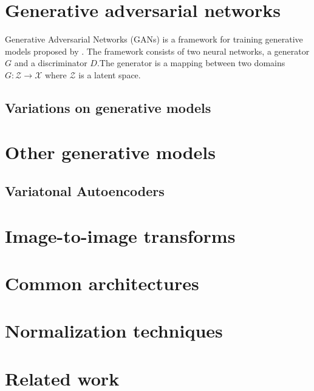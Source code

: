 \section{Generative adversarial networks}
Generative Adversarial Networks (GANs) is a framework for training generative models proposed by \textcite{goodfellow2014generative}. The framework consists of two neural networks, a generator $G$ and a discriminator $D$.The generator is a mapping between two domains $G: \mathcal{Z} \rightarrow \mathcal{X}$ where $\mathcal{Z}$ is a latent space.

\subsection{Variations on generative models}

\section{Other generative models}

\subsection{Variatonal Autoencoders}

\section{Image-to-image transforms}

\section{Common architectures}

\section{Normalization techniques}

\section{Related work}




